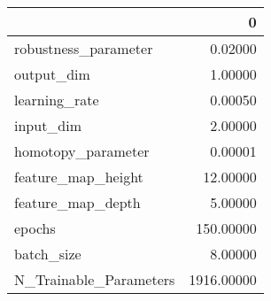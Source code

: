\begin{tabular}{lr}
\toprule
{} &           0 \\
\midrule
robustness\_parameter   &     0.02000 \\
output\_dim             &     1.00000 \\
learning\_rate          &     0.00050 \\
input\_dim              &     2.00000 \\
homotopy\_parameter     &     0.00001 \\
feature\_map\_height     &    12.00000 \\
feature\_map\_depth      &     5.00000 \\
epochs                 &   150.00000 \\
batch\_size             &     8.00000 \\
N\_Trainable\_Parameters &  1916.00000 \\
\bottomrule
\end{tabular}
